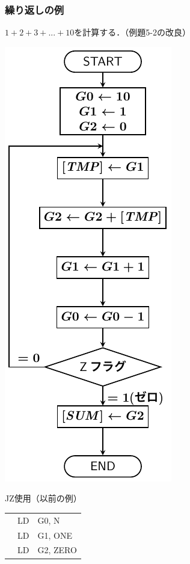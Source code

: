 \documentclass{beamer}                 %
\begin{document}
\begin{frame}
  \frametitle{繰り返しの例}
  $1 + 2 + 3 + ... + 10$を計算する．（例題5-2の改良）\\
  \vfill
  \begin{minipage}{0.26\columnwidth}
    \centerline{\includegraphics[scale=0.55]{../Tikz/flow3A.pdf}}
  \end{minipage}
  \begin{minipage}{0.36\columnwidth}
    {\ttfamily JZ使用（以前の例）\\\scriptsize
      \begin{tabular}{|l|l|l|}
              & LD     & G0, N    \\
              & LD     & G1, ONE  \\
              & LD     & G2, ZERO \\

\end{tabular}}
\end{minipage}
\end{frame}
\end{document}
